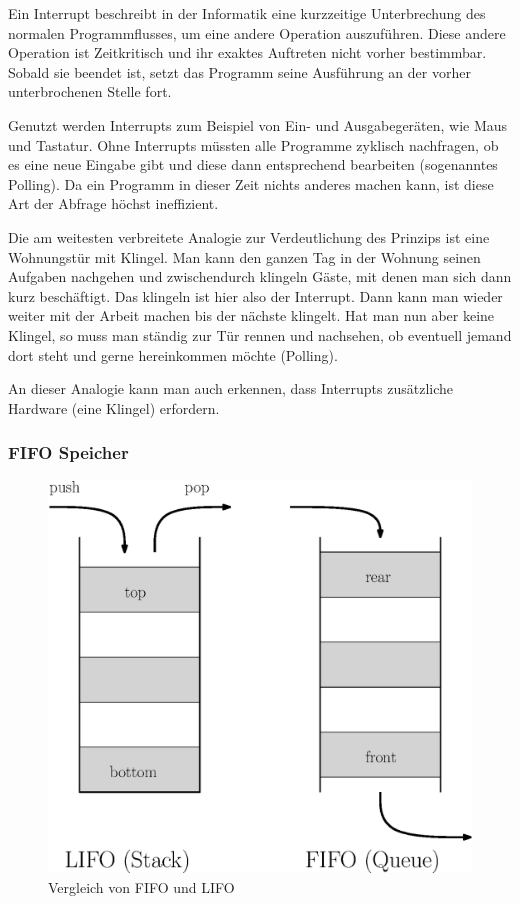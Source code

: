 \documentclass[12pt,a4paper]{scrartcl}
\begin{document}
Ein Interrupt beschreibt in der Informatik eine kurzzeitige Unterbrechung des normalen Programmflusses, um eine andere Operation auszuführen. Diese andere Operation ist Zeitkritisch und ihr exaktes Auftreten nicht vorher bestimmbar. Sobald sie beendet ist, setzt das Programm seine Ausführung an der vorher unterbrochenen Stelle fort.

Genutzt werden Interrupts zum Beispiel von Ein- und Ausgabegeräten, wie Maus und Tastatur. Ohne Interrupts müssten alle Programme zyklisch nachfragen, ob es eine neue Eingabe gibt und diese dann entsprechend bearbeiten (sogenanntes Polling). Da ein Programm in dieser Zeit nichts anderes machen kann, ist diese Art der Abfrage höchst ineffizient.

Die am weitesten verbreitete Analogie zur Verdeutlichung des Prinzips ist eine Wohnungstür mit Klingel. Man kann den ganzen Tag in der Wohnung seinen Aufgaben nachgehen und zwischendurch klingeln Gäste, mit denen man sich dann kurz beschäftigt. Das klingeln ist hier also der Interrupt. Dann kann man wieder weiter mit der Arbeit machen bis der nächste klingelt. Hat man nun aber keine Klingel, so muss man ständig zur Tür rennen und nachsehen, ob eventuell jemand dort steht und gerne hereinkommen möchte (Polling).

An dieser Analogie kann man auch erkennen, dass Interrupts zusätzliche Hardware (eine Klingel) erfordern.


\subsubsection{FIFO Speicher}

\begin{figure}[H]
\centering
\includegraphics[scale=.7]{fifolifo.eps}
\caption{Vergleich von FIFO und LIFO}
\label{fifolifo}
\end{figure}
\end{document}
